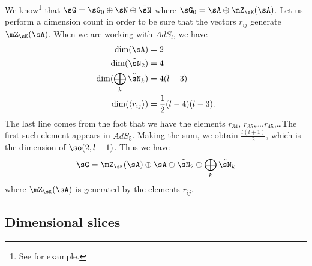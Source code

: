 We know\footnote{See \cite{Berndt} for example.} that $\sG=\sG_0\oplus\sN\oplus\bar\sN$ where $\sG_0=\sA\oplus\mZ_{\sK}(\sA)$. Let us perform a dimension count in order to be sure that the vectors $r_{ij}$ generate $\mZ_{\sK}(\sA)$. When we are working with $AdS_l$, we have
\begin{equation}
	\begin{aligned}[]
		\dim(\sA)                      & =2                        \\
		\dim(\tilde\sN_2)              & =4                        \\
		\dim(\bigoplus_{k}\tilde\sN_k) & =4(l-3)                   \\
		\dim(\langle r_{ij}\rangle)    & =\frac{ 1 }{2}(l-4)(l-3).
	\end{aligned}
\end{equation}
The last line comes from the fact that we have the elements $r_{34}$, $r_{35}$,\ldots,$r_{45}$,\ldots The first such element appears in $AdS_5$. Making the sum, we obtain $\frac{ l(l+1) }{ 2 }$, which is the dimension of $\so(2,l-1)$. Thus we have
\begin{equation}
	\sG=\mZ_{\sK}(\sA)\oplus\sA\oplus\tilde\sN_2\oplus\bigoplus_{k}\tilde\sN_k
\end{equation}
where $\mZ_{\sK}(\sA)$ is generated by the elements $r_{ij}$.
%

%
\subsection{Dimensional slices}
%
\label{LONGSubSecDimensionalSlices}

